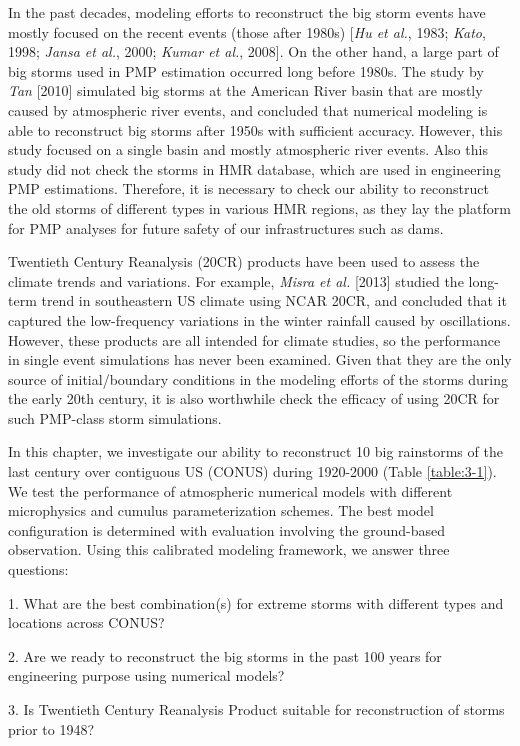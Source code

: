 In the past decades, modeling efforts to reconstruct the big storm events have mostly focused on the recent events (those after 1980s) [\textit{Hu et al.}, 1983; \textit{Kato}, 1998; \textit{Jansa et al.}, 2000; \textit{Kumar et al.}, 2008]. On the other hand, a large part of big storms used in PMP estimation occurred long before 1980s. The study by \textit{Tan} [2010] simulated big storms at the American River basin that are mostly caused by atmospheric river events, and concluded that numerical modeling is able to reconstruct big storms after 1950s with sufficient accuracy. However, this study focused on a single basin and mostly atmospheric river events. Also this study did not check the storms in HMR database, which are used in engineering PMP estimations. Therefore, it is necessary to check our ability to reconstruct the old storms of different types in various HMR regions, as they lay the platform for PMP analyses for future safety of our infrastructures such as dams.

Twentieth Century Reanalysis (20CR) products have been used to assess the climate trends and variations. For example, \textit{Misra et al.} [2013] studied the long-term trend in southeastern US climate using NCAR 20CR, and concluded that it captured the low-frequency variations in the winter rainfall caused by oscillations. However, these products are all intended for climate studies, so the performance in single event simulations has never been examined. Given that they are the only source of initial/boundary conditions in the modeling efforts of the storms during the early 20th century, it is also worthwhile check the efficacy of using 20CR for such PMP-class storm simulations.

In this chapter, we investigate our ability to reconstruct 10 big rainstorms of the last century over contiguous US (CONUS) during 1920-2000 (Table \ref{table:3-1}). We test the performance of atmospheric numerical models with different microphysics and cumulus parameterization schemes. The best model configuration is determined with evaluation involving the ground-based observation. Using this calibrated modeling framework, we answer three questions:

1. What are the best combination(s) for extreme storms with different types and locations across CONUS?

2. Are we ready to reconstruct the big storms in the past 100 years for engineering purpose using numerical models?

3. Is Twentieth Century Reanalysis Product suitable for reconstruction of storms prior to 1948?


